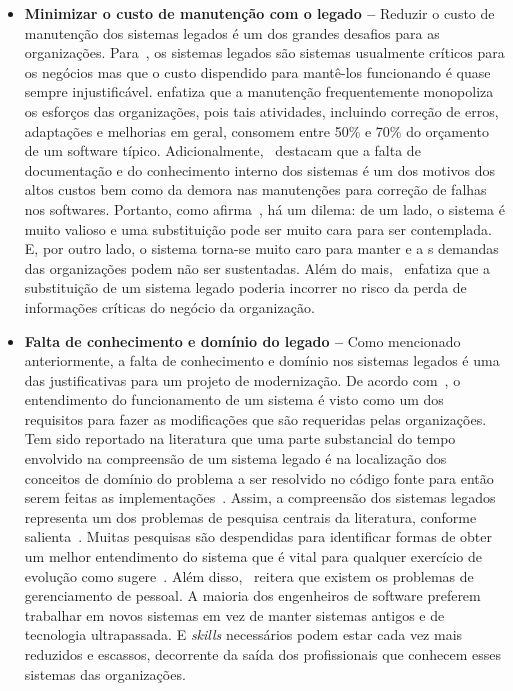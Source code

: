 \begin{itemize}
\item \textbf{Minimizar o custo de manutenção com o legado --} Reduzir o custo de manutenção dos sistemas legados é um dos grandes desafios para as organizações. 
Para~\cite{S4_bennett1995legacy, S15_Comella-DordaASurvey2000, S13_ransom1998method, S12_WeidermanApproaches:1997}, os 
sistemas legados são sistemas usualmente críticos para os negócios mas que o custo dispendido para mantê-los funcionando é quase sempre injustificável. 
\cite{S10_canfora2000decomposing} enfatiza que a manutenção frequentemente monopoliza os esforços das organizações, pois tais atividades, 
incluindo correção de erros, adaptações e melhorias em geral, consomem entre 50\% e 70\% do orçamento de um software típico. 
Adicionalmente,~\cite{S3_Bisbal:1999, S13_wu1997butterfly:1997} destacam que a falta de documentação e do conhecimento interno dos sistemas é um 
dos motivos dos altos custos bem como da demora nas manutenções para correção de falhas nos softwares. Portanto, como afirma~\cite{S4_bennett1995legacy}, há um dilema: 
de um lado, o sistema é muito valioso e uma substituição pode ser muito cara para ser contemplada. E, por outro lado, o sistema torna-se muito caro para manter e a
s demandas das organizações podem não ser sustentadas. Além do mais,~\cite{S23_warren2002renaissance} enfatiza que 
a substituição de um sistema legado poderia incorrer no risco da perda de informações críticas do negócio da organização.

\item \textbf{Falta de conhecimento e domínio do legado --} Como mencionado anteriormente, a falta de conhecimento e domínio nos sistemas legados 
é uma das justificativas para um projeto de modernização. De acordo com~\cite{S4_bennett1995legacy, S3_Bisbal:1999}, o entendimento 
do funcionamento de um sistema é visto como um dos requisitos para fazer as modificações que são requeridas pelas organizações. Tem sido reportado na 
literatura que uma parte substancial do tempo envolvido na compreensão de um sistema legado é na localização dos conceitos de domínio do problema a ser 
resolvido no código fonte para então serem feitas as implementações~\cite{S4_bennett1995legacy, clements2002documenting}. Assim, a compreensão dos sistemas legados representa 
um dos problemas de pesquisa centrais da literatura, conforme salienta~\cite{S4_bennett1995legacy}. 
Muitas pesquisas são despendidas para identificar
formas de obter um melhor entendimento do sistema que é vital para qualquer 
exercício de evolução como sugere~\cite{S01_bennett2000software, S13_ransom1998method}. Além 
disso,~\cite{S4_bennett1995legacy} reitera que existem os problemas de gerenciamento de pessoal. A maioria dos engenheiros de software preferem trabalhar em 
novos sistemas em vez de manter sistemas antigos e de tecnologia ultrapassada. E \textit{skills} necessários podem estar cada vez mais reduzidos e escassos, decorrente da saída dos profissionais que conhecem esses sistemas das organizações.


\end{itemize}
